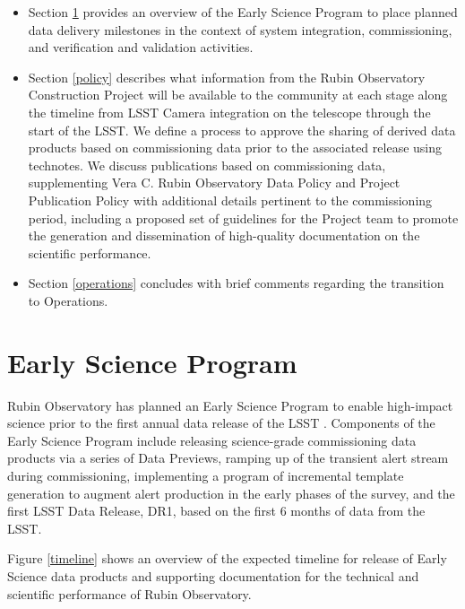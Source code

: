 \documentclass[SE,authoryear,toc,lsstdraft]{lsstdoc}
\begin{document}
\begin{itemize}

  \item Section \ref{early_science} provides an overview of the Early Science Program to place planned data delivery milestones in the context of system integration, commissioning, and verification and validation activities.

  \item Section \ref{policy} describes what information from the Rubin Observatory Construction Project will be available to the community at each stage along the timeline from LSST Camera integration on the telescope through the start of the LSST.
  We define a process to approve the sharing of derived data products based on commissioning data prior to the associated release using technotes.
  We discuss publications based on commissioning data, supplementing Vera C. Rubin Observatory Data Policy  and Project Publication Policy \citep{LPM-162} with additional details pertinent to the commissioning period, including a proposed set of guidelines for the Project team to promote the generation and dissemination of high-quality documentation on the scientific performance.

  \item Section \ref{operations} concludes with brief comments regarding the transition to Operations.

\end{itemize}

\section{Early Science Program}
\label{early_science}

Rubin Observatory has planned an Early Science Program to enable high-impact science prior to the first annual data release of the LSST . Components of the Early Science Program include releasing science-grade commissioning data products via a series of Data Previews, ramping up of the transient alert stream during commissioning, implementing a program of incremental template generation to augment alert production in the early phases of the survey, and the first LSST Data Release, DR1, based on the first 6 months of data from the LSST.

Figure \ref{timeline} shows an overview of the expected timeline for release of Early Science data products and supporting documentation for the technical and scientific performance of Rubin Observatory.
\end{document}
